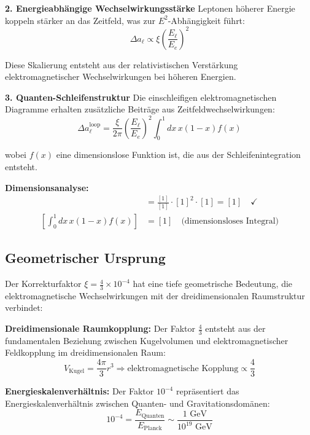 \documentclass[12pt,a4paper]{report}
\begin{document}
	\textbf{2. Energieabhängige Wechselwirkungsstärke}
	Leptonen höherer Energie koppeln stärker an das Zeitfeld, was zur $E^2$-Abhängigkeit führt:
	\begin{equation}
		\Delta a_\ell \propto \xi \left(\frac{E_\ell}{E_e}\right)^2
	\end{equation}
	
	Diese Skalierung entsteht aus der relativistischen Verstärkung elektromagnetischer Wechselwirkungen bei höheren Energien.
	
	\textbf{3. Quanten-Schleifenstruktur}
	Die einschleifigen elektromagnetischen Diagramme erhalten zusätzliche Beiträge aus Zeitfeldwechselwirkungen:
	\begin{equation}
		\Delta a_\ell^{\text{loop}} = \frac{\xi}{2\pi} \left(\frac{E_\ell}{E_e}\right)^2 \int_0^1 dx \, x(1-x) f(x)
	\end{equation}
	
	wobei $f(x)$ eine dimensionslose Funktion ist, die aus der Schleifenintegration entsteht.
	
	\textbf{Dimensionsanalyse:}
	\begin{align}
		[\Delta a_\ell^{\text{loop}}] &= \frac{[1]}{[1]} \cdot [1]^2 \cdot [1] = [1] \quad \checkmark \\
		[\int_0^1 dx \, x(1-x) f(x)] &= [1] \quad \text{(dimensionsloses Integral)}
	\end{align}
	
	\subsection{Geometrischer Ursprung}
	\label{subsec:geometric_origin}
	
	Der Korrekturfaktor $\xi = \frac{4}{3} \times 10^{-4}$ hat eine tiefe geometrische Bedeutung, die elektromagnetische Wechselwirkungen mit der dreidimensionalen Raumstruktur verbindet:
	
	\textbf{Dreidimensionale Raumkopplung:}
	Der Faktor $\frac{4}{3}$ entsteht aus der fundamentalen Beziehung zwischen Kugelvolumen und elektromagnetischer Feldkopplung im dreidimensionalen Raum:
	\begin{equation}
		V_{\text{Kugel}} = \frac{4\pi}{3}r^3 \Rightarrow \text{elektromagnetische Kopplung} \propto \frac{4}{3}
	\end{equation}
	
	\textbf{Energieskalenverhältnis:}
	Der Faktor $10^{-4}$ repräsentiert das Energieskalenverhältnis zwischen Quanten- und Gravitationsdomänen:
	\begin{equation}
		10^{-4} = \frac{E_{\text{Quanten}}}{E_{\text{Planck}}} \sim \frac{1 \text{ GeV}}{10^{19} \text{ GeV}}
	\end{equation}
	
\end{document}
